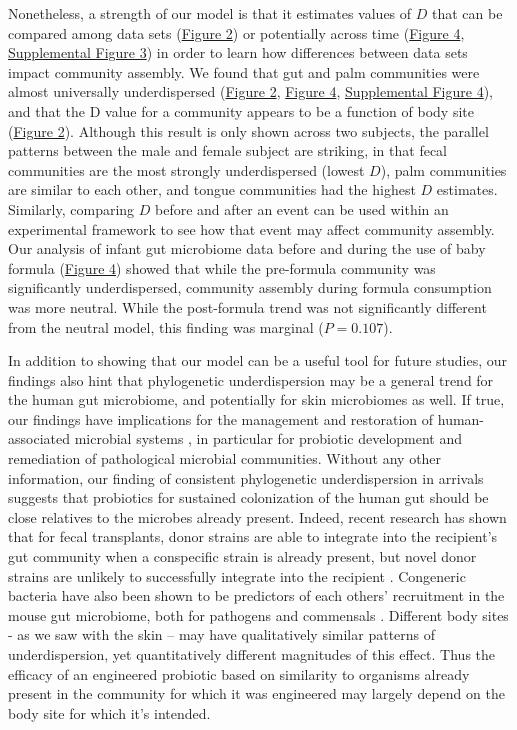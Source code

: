 \documentclass{article}
\begin{document}
\par
Nonetheless, a strength of our model is that it estimates values of \(D\) that can be compared among data sets (\hyperref[sec:figure2]{Figure 2}) or potentially across time (\hyperref[sec:figure4]{Figure 4}, \hyperref[sec:figureS3]{Supplemental Figure 3}) in order to learn how differences between data sets impact community assembly. We found that gut and palm communities were almost universally underdispersed (\hyperref[sec:figure2]{Figure 2}, \hyperref[sec:figure4]{Figure 4}, \hyperref[sec:figureS4]{Supplemental Figure 4}), and that the D value for a community appears to be a function of body site (\hyperref[sec:figure2]{Figure 2}). Although this result is only shown across two subjects, the parallel patterns between the male and female subject are striking, in that fecal communities are the most strongly underdispersed (lowest \(D\)), palm communities are similar to each other, and tongue communities had the highest \(D\) estimates.  Similarly, comparing \(D\) before and after an event can be used within an experimental framework to see how that event may affect community assembly. Our analysis of infant gut microbiome data \cite{Koenig2011} before and during the use of baby formula (\hyperref[sec:figure4]{Figure 4}) showed that while the pre-formula community was significantly underdispersed, community assembly during formula consumption was more neutral. While the post-formula trend was not significantly different from the neutral model, this finding was marginal (\(P = 0.107\)). 
\par
In addition to showing that our model can be a useful tool for future studies, our findings also hint that phylogenetic underdispersion may be a general trend for the human gut microbiome, and potentially for skin microbiomes as well. If true, our findings have implications for the management and restoration of human-associated microbial systems \cite{Shooner2015}, in particular for probiotic development and remediation of pathological microbial communities. Without any other information, our finding of consistent phylogenetic underdispersion in arrivals suggests that probiotics for sustained colonization of the human gut should be close relatives to the microbes already present. Indeed, recent research has shown that for fecal transplants, donor strains are able to integrate into the recipient's gut community when a conspecific strain is already present, but novel donor strains are unlikely to successfully integrate into the recipient \cite{Li2016}. Congeneric bacteria have also been shown to be predictors of each others' recruitment in the mouse gut microbiome, both for pathogens and commensals \cite{Stecher2010}. Different body sites - as we saw with the skin – may have qualitatively similar patterns of underdispersion, yet quantitatively different magnitudes of this effect. Thus the efficacy of an engineered probiotic based on similarity to organisms already present in the community for which it was engineered may largely depend on the body site for which it's intended.
\end{document}
